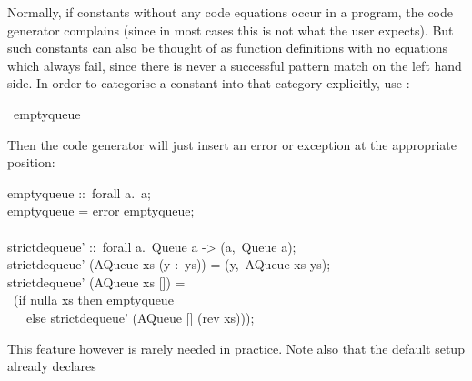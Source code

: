 \begin{isabellebody}
\begin{isamarkuptext}
  Normally, if constants without any code equations occur in a
  program, the code generator complains (since in most cases this is
  not what the user expects).  But such constants can also be thought
  of as function definitions with no equations which always fail,
  since there is never a successful pattern match on the left hand
  side.  In order to categorise a constant into that category
  explicitly, use \hyperlink{command.code-abort}{\mbox{}}:%
\end{isamarkuptext}%
\isamarkuptrue%
%
\isadelimquote
%
\endisadelimquote
%
\isatagquote
{}\isamarkupfalse%
\ empty{\isacharunderscore}queue%
\endisatagquote
{\isafoldquote}%
%
\isadelimquote
%
\endisadelimquote
%
\begin{isamarkuptext}%
\noindent Then the code generator will just insert an error or
  exception at the appropriate position:%
\end{isamarkuptext}%
\isamarkuptrue%
%
\isadelimquote
%
\endisadelimquote
%
\isatagquote
%
\begin{isamarkuptext}%
\isatypewriter%
\noindent%
\hspace*{0pt}empty{}queue ::~forall a.~a;\\
\hspace*{0pt}empty{}queue = error {}empty{}queue{};\\
\hspace*{0pt}\\
\hspace*{0pt}strict{}dequeue' ::~forall a.~Queue a -> (a,~Queue a);\\
\hspace*{0pt}strict{}dequeue' (AQueue xs (y :~ys)) = (y,~AQueue xs ys);\\
\hspace*{0pt}strict{}dequeue' (AQueue xs []) =\\
\hspace*{0pt} ~(if nulla xs then empty{}queue\\
\hspace*{0pt} ~~~else strict{}dequeue' (AQueue [] (rev xs)));%
\end{isamarkuptext}%
\isamarkuptrue%
%
\endisatagquote
{\isafoldquote}%
%
\isadelimquote
%
\endisadelimquote
%
\begin{isamarkuptext}%
\noindent This feature however is rarely needed in practice.
  Note also that the  default setup already declares

\end{isamarkuptext}
\end{isabellebody}

